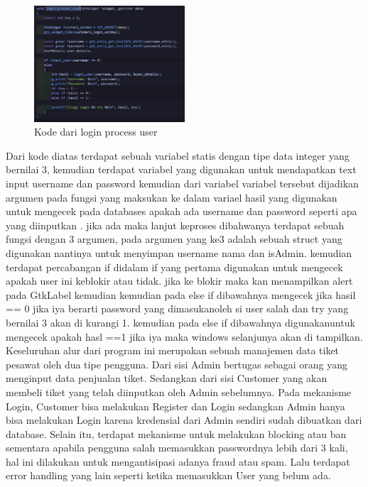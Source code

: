 \documentclass[a4paper,12pt]{article}
\begin{document}
\begin{figure}[!htbp]
    \centering
    \includegraphics[width=0.5\textwidth]{./img/login_process_user.png}
    \caption{Kode dari login process user}
\end{figure}
\FloatBarrier
Dari kode diatas terdapat sebuah variabel statis dengan tipe data integer yang bernilai 3, kemudian terdapat variabel yang digunakan untuk mendapatkan text input username dan password
kemudian dari variabel variabel tersebut dijadikan argumen pada fungsi \texttt{} yang maksukan ke dalam variael hasil yang digunakan untuk mengecek pada databases apakah ada username dan password seperti apa yang diinputkan .
jika ada maka lanjut keproses dibahwanya terdapat sebuah fungsi \texttt{} dengan 3 argumen, pada argumen yang ke3 adalah sebuah struct yang digunakan nantinya untuk menyimpan username nama dan isAdmin.
kemudian terdapat percabangan if didalam if yang pertama digunakan untuk mengecek apakah user ini keblokir atau tidak.
jika ke blokir maka kan menampilkan alert pada GtkLabel kemudian kemudian pada else if dibawahnya mengecek jika hasil == 0  jika iya berarti password yang dimasukanoleh si user salah dan try yang bernilai 3 akan di kurangi 1.
kemudian pada else if dibawahnya digunakanuntuk mengecek apakah hasl ==1 jika iya maka windows selanjunya akan di tampilkan.
Keseluruhan alur dari program ini merupakan sebuah manajemen data tiket pesawat oleh dua tipe pengguna.
Dari sisi Admin bertugas sebagai orang yang menginput data penjualan tiket. Sedangkan dari sisi Customer yang akan membeli tiket yang telah diinputkan oleh Admin sebelumnya.
Pada mekanisme Login, Customer bisa melakukan Register dan Login sedangkan Admin hanya bisa melakukan Login karena kredensial dari Admin sendiri sudah dibuatkan dari database. Selain itu, terdapat mekanisme untuk melakukan blocking atau ban
sementara apabila pengguna salah memasukkan passwordnya lebih dari 3 kali, hal ini dilakukan untuk mengantisipasi adanya fraud atau spam. Lalu terdapat error handling yang lain seperti ketika memasukkan User yang belum ada.
\end{document}
